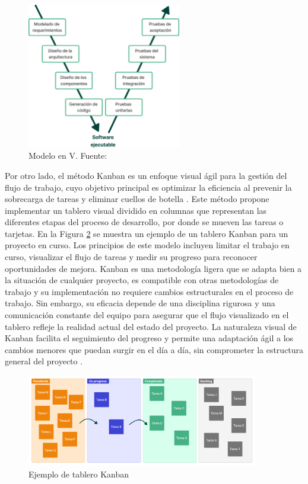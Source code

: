 \begin{figure}[!tb]
	\centering
	\includegraphics[width=0.6\textwidth]{Figures/model-v.png}
	\caption[Modelo en V]{Modelo en V. Fuente: \cite{pressman2010ingenieria}}
    \label{fig:model-v}
\end{figure}

Por otro lado, el método Kanban es un enfoque visual ágil para la gestión del flujo de trabajo, cuyo objetivo principal es optimizar la eficiencia al prevenir la sobrecarga de tareas y eliminar cuellos de botella \cite{alaidaros2021kanban}. Este método propone implementar un tablero visual dividido en columnas que representan las diferentes etapas del proceso de desarrollo, por donde se mueven las tareas o tarjetas. En la Figura \ref{fig:kanban-board} se muestra un ejemplo de un tablero Kanban para un proyecto en curso. Los principios de este modelo incluyen limitar el trabajo en curso, visualizar el flujo de tareas y medir su progreso para reconocer oportunidades de mejora. Kanban es una metodología ligera que se adapta bien a la situación de cualquier proyecto, es compatible con otras metodologías de trabajo y su implementación no requiere cambios estructurales en el proceso de trabajo. Sin embargo, su eficacia depende de una disciplina rigurosa y una comunicación constante del equipo para asegurar que el flujo visualizado en el tablero refleje la realidad actual del estado del proyecto. La naturaleza visual de Kanban facilita el seguimiento del progreso y permite una adaptación ágil a los cambios menores que puedan surgir en el día a día, sin comprometer la estructura general del proyecto \cite{alaidaros2021kanban}.

\begin{figure}[!tb]
    \centering
    \includegraphics[width=0.9\textwidth]{Figures/model-kanban.png}
    \caption[Tablero Kanban]{Ejemplo de tablero Kanban}
    \label{fig:kanban-board}
\end{figure}

